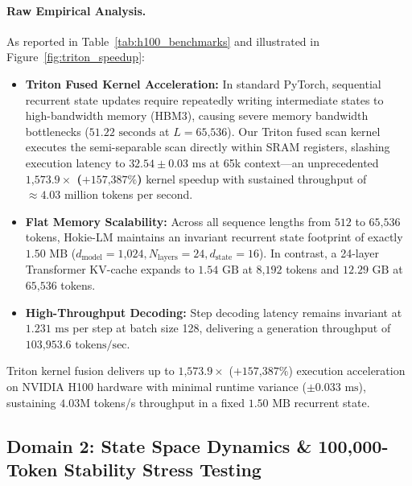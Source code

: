 \paragraph{Raw Empirical Analysis.}
As reported in Table~\ref{tab:h100_benchmarks} and illustrated in Figure~\ref{fig:triton_speedup}:
\begin{itemize}[leftmargin=*]
    \item \textbf{Triton Fused Kernel Acceleration:} In standard PyTorch, sequential recurrent state updates require repeatedly writing intermediate states to high-bandwidth memory (HBM3), causing severe memory bandwidth bottlenecks ($51.22\text{ seconds}$ at $L=65\text{,}536$). Our Triton fused scan kernel executes the semi-separable scan directly within SRAM registers, slashing execution latency to \textbf{$32.54 \pm 0.03\text{ ms}$} at 65k context—an unprecedented \textbf{$1\text{,}573.9\times$ ($+157\text{,}387\%$)} kernel speedup with sustained throughput of $\approx 4.03\text{ million}$ tokens per second.
    \item \textbf{Flat Memory Scalability:} Across all sequence lengths from $512$ to $65\text{,}536$ tokens, Hokie-LM maintains an invariant recurrent state footprint of exactly \textbf{$1.50\text{ MB}$} ($d_{\text{model}}=1\text{,}024, N_{\text{layers}}=24, d_{\text{state}}=16$). In contrast, a 24-layer Transformer KV-cache expands to $1.54\text{ GB}$ at $8\text{,}192$ tokens and $12.29\text{ GB}$ at $65\text{,}536$ tokens.
    \item \textbf{High-Throughput Decoding:} Step decoding latency remains invariant at \textbf{$1.231\text{ ms}$} per step at batch size 128, delivering a generation throughput of \textbf{$103\text{,}953.6\text{ tokens/sec}$}.
\end{itemize}

\begin{takeawaybox}
Triton kernel fusion delivers up to $1\text{,}573.9\times$ ($+157\text{,}387\%$) execution acceleration on NVIDIA H100 hardware with minimal runtime variance ($\pm 0.033\text{ ms}$), sustaining $4.03\text{M}$ tokens/s throughput in a fixed $1.50\text{ MB}$ recurrent state.
\end{takeawaybox}

\subsection{Domain 2: State Space Dynamics \& 100,000-Token Stability Stress Testing}
\label{sec:exp_cafe}

